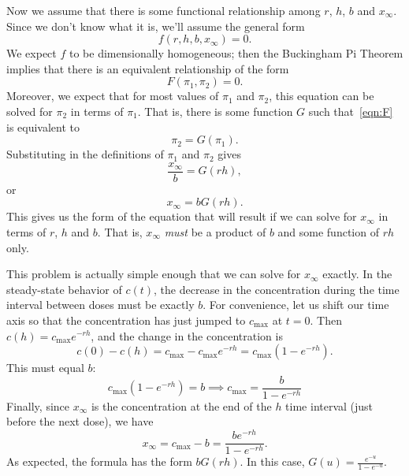 \documentclass[reqno]{immbook}
\numberwithin{equation}{chapter}
\numberwithin{question}{section}
\numberwithin{theorem}{chapter}
\numberwithin{figure}{chapter}
\theoremstyle{definition}
\begin{document}
Now we assume that there is some functional relationship
among $r$, $h$, $b$ and $x_{\infty}$.  Since we don't know
what it is, we'll assume the general form
\begin{equation}
  f(r,h,b,x_{\infty}) = 0.
\end{equation}
We expect $f$ to be dimensionally homogeneous; then the
Buckingham Pi Theorem implies that there is an equivalent
relationship of the form
\begin{equation}
   F(\pi_1, \pi_2) = 0.
\label{eqn:F}
\end{equation}
Moreover, we expect that for most values of $\pi_1$
and $\pi_2$, this equation can be solved for $\pi_2$
in terms of $\pi_1$. That is, there is some function
$G$ such that~\eqref{eqn:F} is equivalent to
\begin{equation}
   \pi_2 = G(\pi_1).
\end{equation}
Substituting in the definitions of $\pi_1$ and $\pi_2$ gives
\begin{equation}
   \frac{x_{\infty}}{b} = G(rh),
\end{equation}
or
\begin{equation}
   x_{\infty} = bG(rh).
\end{equation}
This gives us the form of the equation that will result if
we can solve for $x_{\infty}$ in terms of $r$, $h$ and $b$.
That is, $x_{\infty}$ \emph{must} be
a product of $b$ and some function of $rh$ only.

This problem is actually simple enough that we can
solve for $x_{\infty}$ exactly.
In the steady-state behavior of $c(t)$, the decrease
in the concentration during the time interval
between doses must be exactly $b$.
For convenience, let us shift our time axis
so that the concentration has just jumped to 
$c_{\textrm{max}}$ at $t=0$.
Then $c(h) = c_{\textrm{max}}e^{-rh}$, and the change in the
concentration is
\begin{equation}
   c(0)-c(h) = c_{\textrm{max}}-c_{\textrm{max}}e^{-rh} = c_{\textrm{max}}(1-e^{-rh}).
\end{equation}
This must equal $b$:
\begin{equation}
   c_{\textrm{max}}(1-e^{-rh})=b \implies
        c_{\textrm{max}} = \frac{b}{1-e^{-rh}} 
\end{equation}
Finally, since $x_{\infty}$ is the concentration at the
end of the $h$ time interval (just before the next dose),
we have
\begin{equation}
   x_{\infty} = c_{\textrm{max}}-b = \frac{b e^{-rh}}{1-e^{-rh}}.
\end{equation}
As expected, the formula has the form $bG(rh)$.
In this case, $G(u) = \frac{e^{-u}}{1-e^{-u}}$.
%
\end{document}
